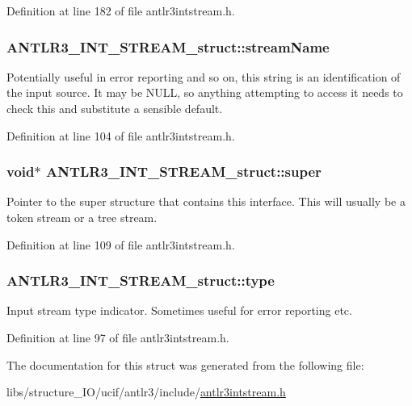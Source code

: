 Definition at line 182 of file antlr3intstream.\-h.

\hypertarget{struct_a_n_t_l_r3___i_n_t___s_t_r_e_a_m__struct_a8071957bbe514572d50d61500ee054e5}{
\subsubsection[{stream\-Name}]{ A\-N\-T\-L\-R3\-\_\-\-I\-N\-T\-\_\-\-S\-T\-R\-E\-A\-M\-\_\-struct\-::stream\-Name}}\label{struct_a_n_t_l_r3___i_n_t___s_t_r_e_a_m__struct_a8071957bbe514572d50d61500ee054e5}
Potentially useful in error reporting and so on, this string is an identification of the input source. It may be N\-U\-L\-L, so anything attempting to access it needs to check this and substitute a sensible default. 

Definition at line 104 of file antlr3intstream.\-h.

\hypertarget{struct_a_n_t_l_r3___i_n_t___s_t_r_e_a_m__struct_a6f5f3b5448e33c1e083849ca67465d05}{
\subsubsection[{super}]{\setlength{\rightskip}{0pt plus 5cm}void$\ast$ A\-N\-T\-L\-R3\-\_\-\-I\-N\-T\-\_\-\-S\-T\-R\-E\-A\-M\-\_\-struct\-::super}}\label{struct_a_n_t_l_r3___i_n_t___s_t_r_e_a_m__struct_a6f5f3b5448e33c1e083849ca67465d05}
Pointer to the super structure that contains this interface. This will usually be a token stream or a tree stream. 

Definition at line 109 of file antlr3intstream.\-h.

\hypertarget{struct_a_n_t_l_r3___i_n_t___s_t_r_e_a_m__struct_a43cdca646646b19cb679ca87f45b03f8}{
\subsubsection[{type}]{ A\-N\-T\-L\-R3\-\_\-\-I\-N\-T\-\_\-\-S\-T\-R\-E\-A\-M\-\_\-struct\-::type}}\label{struct_a_n_t_l_r3___i_n_t___s_t_r_e_a_m__struct_a43cdca646646b19cb679ca87f45b03f8}
Input stream type indicator. Sometimes useful for error reporting etc. 

Definition at line 97 of file antlr3intstream.\-h.



The documentation for this struct was generated from the following file\-:\begin{DoxyCompactItemize}
\item 
libs/structure\-\_\-\-I\-O/ucif/antlr3/include/\hyperlink{antlr3intstream_8h}{antlr3intstream.\-h}\end{DoxyCompactItemize}
